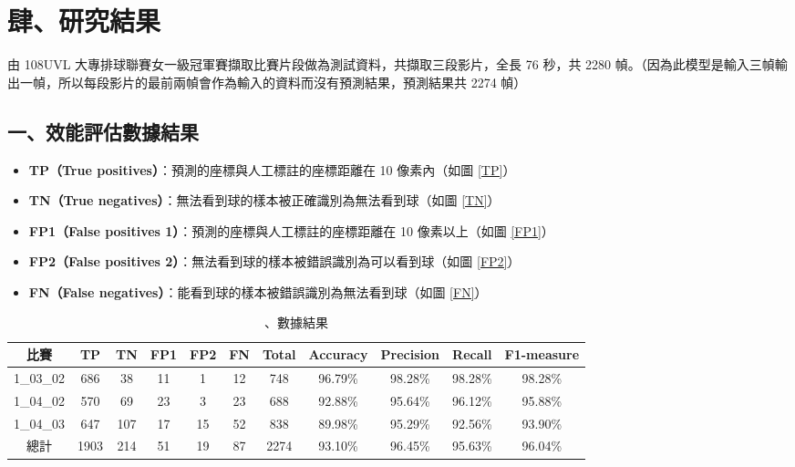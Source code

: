 \section{肆、研究結果}

由 108UVL 大專排球聯賽女一級冠軍賽擷取比賽片段做為測試資料，共擷取三段影片，全長 76 秒，共 2280 幀。（因為此模型是輸入三幀輸出一幀，所以每段影片的最前兩幀會作為輸入的資料而沒有預測結果，預測結果共 2274 幀）

\subsection{一、效能評估數據結果}

\begin{itemize}
    \item []\textbf{TP（True positives）}：預測的座標與人工標註的座標距離在 10 像素內（如圖 \ref{TP}）
    \item []\textbf{TN（True negatives）}：無法看到球的樣本被正確識別為無法看到球（如圖 \ref{TN}）
    \item []\textbf{FP1（False positives 1）}：預測的座標與人工標註的座標距離在 10 像素以上（如圖 \ref{FP1}）
    \item []\textbf{FP2（False positives 2）}：無法看到球的樣本被錯誤識別為可以看到球（如圖 \ref{FP2}）
    \item []\textbf{FN（False negatives）}：能看到球的樣本被錯誤識別為無法看到球（如圖 \ref{FN}）
\end{itemize}

\begin{table}[H]
    \centering
    \caption{、數據結果}
    \label{數據結果}
    \begin{tabular}{ccccccccccc}
        \hline
        \textbf{比賽} & \textbf{TP} & \textbf{TN} & \textbf{FP1} & \textbf{FP2} & \textbf{FN} & \textbf{Total} & \textbf{Accuracy} & \textbf{Precision} & \textbf{Recall} & \textbf{F1-measure}\\
        \hline
        1\_03\_02 & 686 & 38 & 11 & 1 & 12 & 748 & 96.79\% & 98.28\% & 98.28\% & 98.28\%\\
        \hline
        1\_04\_02 & 570 & 69 & 23 & 3 & 23 & 688 & 92.88\% & 95.64\% & 96.12\% & 95.88\%\\
        \hline
        1\_04\_03 & 647 & 107 & 17 & 15 & 52 & 838 & 89.98\% & 95.29\% & 92.56\% & 93.90\%\\
        \hline
        總計 & 1903 & 214 & 51 & 19 & 87 & 2274 & 93.10\% & 96.45\% & 95.63\% & 96.04\%\\
        \hline
    \end{tabular}
\end{table}

